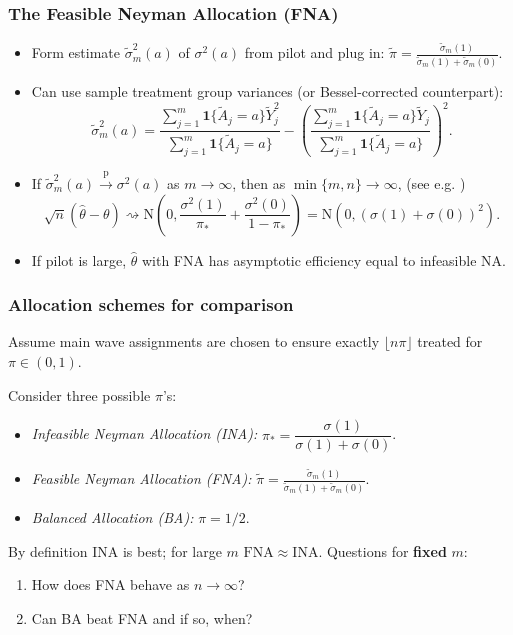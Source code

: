 \documentclass[aspectratio=169, 10pt]{beamer}
\theoremstyle{definition}
\theoremstyle{plain}
\def\ind{\mathbf{1}}
\def\pto{\overset{\mathrm{p}}{\to}}
\def\dto{\rightsquigarrow}
\def\Normal{\mathrm{N}} %
\def\FNA{\mathrm{FNA}}
\begin{document}
\begin{frame}
\frametitle{The Feasible Neyman Allocation (FNA)}
\begin{itemize}
  \item Form estimate \(\tilde{\sigma}_{m}^{2} (a)\) of
    \(\sigma^{2} (a)\) from pilot and plug in: \(\tilde{\pi} =
    \frac{\tilde{\sigma}_{m} (1)}{\tilde{\sigma}_{m} (1) + \tilde{\sigma}_{m}
    (0)}\).
    \vfill
  \item Can use sample treatment group variances (or Bessel-corrected
    counterpart):
    \begin{equation*}
      \tilde{\sigma}_{m}^{2} (a) = \frac{\sum_{j = 1}^{m} \ind \{\tilde{A}_{j} =
      a\} \tilde{Y}_{j}^{2}}{\sum_{j = 1}^{m} \ind \{\tilde{A}_{j} = a\}} -
      \left( \frac{\sum_{j = 1}^{m} \ind \{\tilde{A}_{j} = a\}
      \tilde{Y}_{j}}{\sum_{j = 1}^{m} \ind \{\tilde{A}_{j} = a\}} \right)^{2}.
    \end{equation*}
    \vfill
  \item If \(\tilde{\sigma}_{m}^{2} (a) \pto \sigma^{2} (a)\) as \(m \to
    \infty\), then as \(\min \{m, n\} \to \infty\), (see
    e.g. \citet{2011hahnAdaptiveExperimentalDesign})
    \begin{equation*}
      \sqrt{n} (\hat{\theta} - \theta) \dto \Normal \left( 0, \frac{\sigma^{2}
      (1)}{\pi_{\ast}} + \frac{\sigma^{2} (0)}{1 - \pi_{\ast}} \right) =
      \Normal (0, (\sigma (1) + \sigma (0))^{2}).
    \end{equation*}
    \vfill
  \item If pilot is large, \(\hat{\theta}\) with FNA has asymptotic efficiency
    equal to infeasible NA.
\end{itemize}
\end{frame}

\begin{frame}
\frametitle{Allocation schemes for comparison}
Assume main wave assignments are chosen to ensure exactly \(\lfloor n \pi
\rfloor\) treated for \(\pi \in (0, 1)\).

\vfill

Consider three possible \(\pi\)'s:
\vfill
\begin{itemize}
  \item \emph{Infeasible Neyman Allocation (INA):}
    \(\pi_{*} = \dfrac{\sigma(1)}{\sigma(1) + \sigma(0)}\).
    \vfill
  \item \emph{Feasible Neyman Allocation (FNA):}
    \(\tilde{\pi} = \frac{\tilde\sigma_m(1)}{\tilde\sigma_m(1) +
    \tilde\sigma_m(0)}\).
    \vfill
  \item \emph{Balanced Allocation (BA):} \(\pi = 1/2\).
\end{itemize}
\vfill
By definition INA is best; for large \(m\) \(\FNA \approx \mathrm{INA}\).
Questions for \textbf{fixed} \(m\):
\vfill
\begin{enumerate}
  \item How does FNA behave as \(n \to \infty\)?
    \vfill
  \item Can BA beat FNA and if so, when?
\end{enumerate}
\end{frame}
\end{document}
